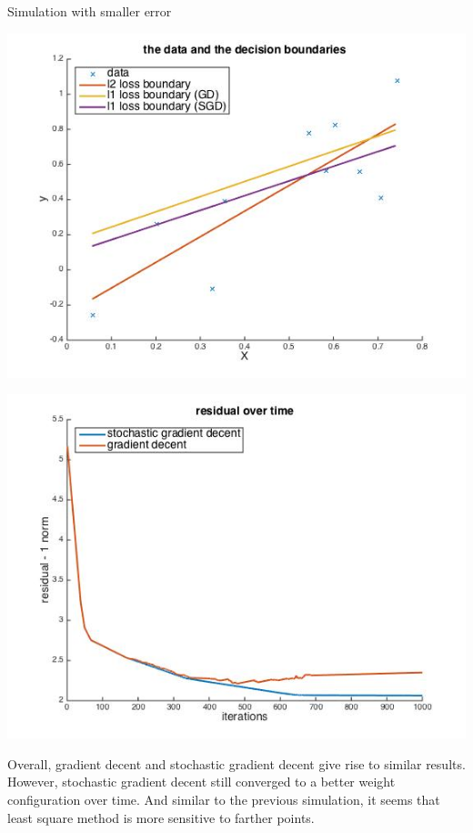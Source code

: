 \documentclass[paper=a4, fontsize=11pt]{scrartcl} %
\numberwithin{equation}{section} %
\numberwithin{figure}{section} %
\numberwithin{table}{section} %
\begin{document}
\newpage
Simulation with smaller error 
\begin{center}
\includegraphics[scale=.5]{hw7_2c_smer_fit.jpg}
\end{center}
\begin{center}
\includegraphics[scale=.5]{hw7_2c_smer_gdsgd.jpg}
\end{center}

Overall, gradient decent and stochastic gradient decent give rise to similar results. However, stochastic gradient decent still converged to a better weight configuration over time. And similar to the previous simulation, it seems that least square method is more sensitive to farther points. 
\end{document}
